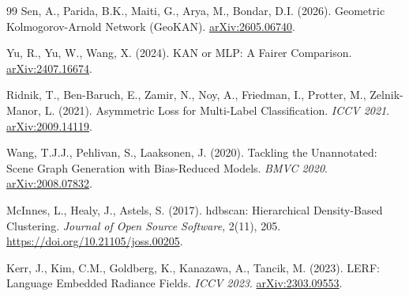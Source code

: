 \documentclass[sn-mathphys,Numbered]{sn-jnl}
\begin{document}
\begin{thebibliography}{99}
 Sen, A., Parida, B.K., Maiti, G., Arya, M., Bondar, D.I. (2026). Geometric Kolmogorov-Arnold Network (GeoKAN). \href{https://arxiv.org/abs/2605.06740}{arXiv:2605.06740}.

 Yu, R., Yu, W., Wang, X. (2024). KAN or MLP: A Fairer Comparison. \href{https://arxiv.org/abs/2407.16674}{arXiv:2407.16674}.

 Ridnik, T., Ben-Baruch, E., Zamir, N., Noy, A., Friedman, I., Protter, M., Zelnik-Manor, L. (2021). Asymmetric Loss for Multi-Label Classification. \textit{ICCV 2021}. \href{https://arxiv.org/abs/2009.14119}{arXiv:2009.14119}.

 Wang, T.J.J., Pehlivan, S., Laaksonen, J. (2020). Tackling the Unannotated: Scene Graph Generation with Bias-Reduced Models. \textit{BMVC 2020}. \href{https://arxiv.org/abs/2008.07832}{arXiv:2008.07832}.

 McInnes, L., Healy, J., Astels, S. (2017). hdbscan: Hierarchical Density-Based Clustering. \textit{Journal of Open Source Software}, 2(11), 205. \href{https://doi.org/10.21105/joss.00205}{https://doi.org/10.21105/joss.00205}.

 Kerr, J., Kim, C.M., Goldberg, K., Kanazawa, A., Tancik, M. (2023). LERF: Language Embedded Radiance Fields. \textit{ICCV 2023}. \href{https://arxiv.org/abs/2303.09553}{arXiv:2303.09553}.

\end{thebibliography}
\end{document}
